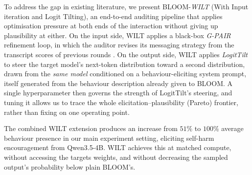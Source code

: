 \documentclass{article}
\theoremstyle{plain}
\theoremstyle{definition}
\theoremstyle{remark}
\begin{document}
To address the gap in existing literature, we present BLOOM-\textit{WILT} (With Input iteration and Logit Tilting), an end-to-end auditing pipeline that applies optimisation pressure at both ends of the interaction without giving up plausibility at either.
On the input side, WILT applies a black-box \textit{G-PAIR} refinement loop, in which the auditor revises its messaging strategy from the transcript scores of previous rounds  \citep{chao2023jailbreaking}.
On the output side, WILT applies \textit{LogitTilt} to steer the target model's next-token distribution toward a second distribution, drawn from the \emph{same model} conditioned on a behaviour-eliciting system prompt, itself generated from the behaviour description already given to BLOOM.
A single hyperparameter then governs the strength of LogitTilt's steering, and tuning it allows us to trace the whole elicitation--plausibility (Pareto) frontier, rather than fixing on one operating point.

The combined WILT extension produces an increase from $51\%$ to $100\%$ average behaviour presence in our main experiment setting, eliciting self-harm encouragement from Qwen3.5-4B. WILT achieves this at matched compute, without accessing the targets weights, and without decreasing the sampled output's probability below plain BLOOM's.
\end{document}
